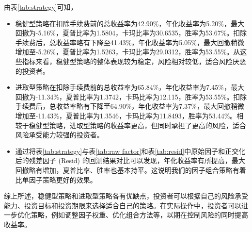 \documentclass[11pt]{article}
\begin{document}
由表\ref{tab:strategy}可知，
\begin{itemize}
    \item 稳健型策略在扣除手续费前的总收益率为42.90\%，年化收益率为5.20\%，最大回撤为-5.16\%，夏普比率为1.5804，卡玛比率为30.6535，胜率为53.67\%。扣除手续费后，总收益率略有下降至41.43\%，年化收益率为5.05\%，最大回撤稍微增加至-5.26\%，夏普比率为1.5263，卡玛比率为29.0312，胜率为53.55\%。从这些指标来看，稳健型策略的整体表现较为稳定，风险相对较低，适合风险厌恶的投资者。
    \item 进取型策略在扣除手续费前的总收益率为65.84\%，年化收益率为7.45\%，最大回撤为-11.34\%，夏普比率为1.3742，卡玛比率为12.115，胜率为53.55\%。扣除手续费后，总收益率略有下降至64.90\%，年化收益率为7.37\%，最大回撤稍微增加至-11.43\%，夏普比率为1.3546，卡玛比率为11.8493，胜率为53.44\%。相较于稳健型策略，进取型策略的收益率更高，但同时承担了更高的风险，适合风险承受能力较强的投资者。
    \item 通过将表\ref{tab:strategy}与表\ref{tab:raw factor}和表\ref{tab:resid}中原始因子和正交化后的残差因子 (Resid) 的回测结果对比可以发现，年化收益率有所提高，最大回撤略有增加，夏普比率、胜率也基本持平。这说明我们的因子组合策略有着比单因子策略更好的效果。
\end{itemize}

综上所述，稳健型策略和进取型策略各有优缺点，投资者可以根据自己的风险承受能力、投资目标和投资期限来选择适合自己的策略。在实际操作中，投资者可以进一步优化策略，例如调整因子权重、优化组合方法等，以期在控制风险的同时提高收益率。
\end{document}
